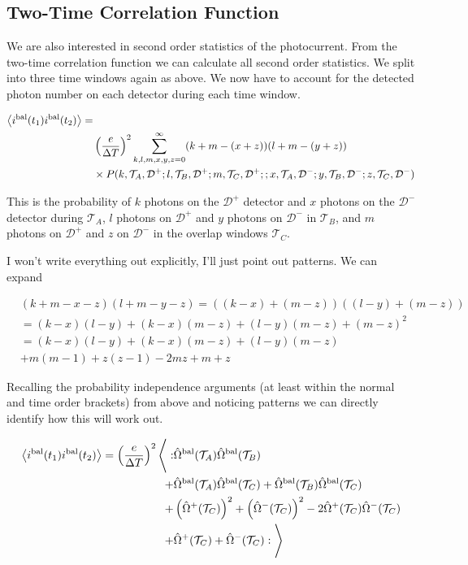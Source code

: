 \documentclass[12pt]{article}
\newcommand{\mc}[1]{\mathcal{#1}}
\begin{document}
\subsection{Two-Time Correlation Function}

We are also interested in second order statistics of the photocurrent. From the two-time correlation function we can calculate all second order statistics. We split into three time windows again as above. We now have to account for the detected photon number on each detector during each time window.

\begin{align}
\Braket{i^{\text{bal}}(t_1)i^{\text{bal}}(t_2)} =&\\
&\left(\frac{e}{\Delta T}\right)^2 \sum_{k,l,m,x,y,z=0}^{\infty} (k+m-(x+z))(l+m-(y+z))\\
&\times P(k,\mc{T}_A, \mc{D}^+ ;l, \mc{T}_B, \mc{D}^+;m,\mc{T}_C, \mc{D}^+ ;; x,\mc{T}_A, \mc{D}^- ; y,\mc{T}_B, \mc{D}^- ; z,\mc{T}_C, \mc{D}^-)
\end{align}

This is the probability of $k$ photons on the $\mc{D}^+$ detector and $x$ photons on the $\mc{D}^-$ detector during $\mc{T}_A$, $l$ photons on $\mc{D}^+$ and $y$ photons on $\mc{D}^-$ in $\mc{T}_B$, and $m$ photons on $\mc{D}^+$ and $z$ on $\mc{D}^-$ in the overlap windows $\mc{T}_C$.

I won't write everything out explicitly, I'll just point out patterns. We can expand

\begin{align}
&(k+m-x-z)(l+m-y-z) = ((k-x) + (m-z))((l-y) + (m-z)) \\
&=(k-x)(l-y) + (k-x)(m-z) + (l-y)(m-z) + (m-z)^2\\
&= (k-x)(l-y) + (k-x)(m-z) + (l-y)(m-z)\\
&+ m(m-1) + z(z-1) - 2 mz + m + z
\end{align}

Recalling the probability independence arguments (at least within the normal and time order brackets) from above and noticing patterns we can directly identify how this will work out.

\begin{align}
\Braket{i^{\text{bal}}(t_1)i^{\text{bal}}(t_2)} = \left(\frac{e}{\Delta T}\right)^2 \Bigg \langle: &\hat{\Omega}^{\text{bal}}(\mc{T}_A) \hat{\Omega}^{\text{bal}}(\mc{T}_B)\\
+ &\hat{\Omega}^{\text{bal}}(\mc{T}_A) \hat{\Omega}^{\text{bal}}(\mc{T}_C) + \hat{\Omega}^{\text{bal}}(\mc{T}_B) \hat{\Omega}^{\text{bal}}(\mc{T}_C)\\
+ &\left(\hat{\Omega}^+(\mc{T}_C)\right)^2 + \left(\hat{\Omega}^-(\mc{T}_C)\right)^2 - 2 \hat{\Omega}^+(\mc{T}_C) \hat{\Omega}^-(\mc{T}_C)\\
+&\hat{\Omega}^+(\mc{T}_C) + \hat{\Omega}^-(\mc{T}_C)
:\Bigg \rangle
\end{align}
\end{document}
